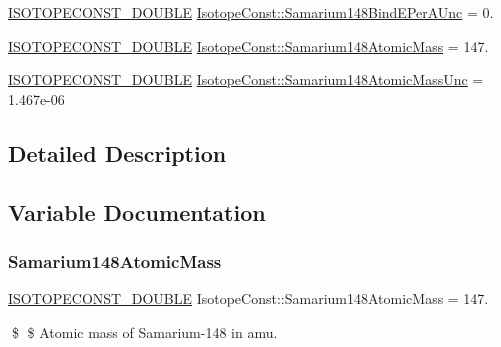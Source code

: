 \begin{DoxyCompactItemize}
\mbox{\hyperlink{group___isotope_const-_macros_ga8f45a7272ce02c0b4c65c44636ed719a}{I\+S\+O\+T\+O\+P\+E\+C\+O\+N\+S\+T\+\_\+\+D\+O\+U\+B\+LE}} \mbox{\hyperlink{group___isotope_const-_samarium-_sm148_gad64a4ff5a9c8838b513bfe84b3ed7021}{Isotope\+Const\+::\+Samarium148\+Bind\+E\+Per\+A\+Unc}} = 0.
\item 
\mbox{\hyperlink{group___isotope_const-_macros_ga8f45a7272ce02c0b4c65c44636ed719a}{I\+S\+O\+T\+O\+P\+E\+C\+O\+N\+S\+T\+\_\+\+D\+O\+U\+B\+LE}} \mbox{\hyperlink{group___isotope_const-_samarium-_sm148_ga2114168440218722fac34027bbcd74f6}{Isotope\+Const\+::\+Samarium148\+Atomic\+Mass}} = 147.
\item 
\mbox{\hyperlink{group___isotope_const-_macros_ga8f45a7272ce02c0b4c65c44636ed719a}{I\+S\+O\+T\+O\+P\+E\+C\+O\+N\+S\+T\+\_\+\+D\+O\+U\+B\+LE}} \mbox{\hyperlink{group___isotope_const-_samarium-_sm148_gad35de4c149ee1a39d3cb49550cb1d5a1}{Isotope\+Const\+::\+Samarium148\+Atomic\+Mass\+Unc}} = 1.\+467e-\/06
\end{DoxyCompactItemize}


\subsection{Detailed Description}


\subsection{Variable Documentation}
\mbox{\label{group___isotope_const-_samarium-_sm148_ga2114168440218722fac34027bbcd74f6}} 
\subsubsection{\texorpdfstring{Samarium148\+Atomic\+Mass}{Samarium148AtomicMass}}
{\footnotesize\ttfamily \mbox{\hyperlink{group___isotope_const-_macros_ga8f45a7272ce02c0b4c65c44636ed719a}{I\+S\+O\+T\+O\+P\+E\+C\+O\+N\+S\+T\+\_\+\+D\+O\+U\+B\+LE}} Isotope\+Const\+::\+Samarium148\+Atomic\+Mass = 147.}

\$ \$ Atomic mass of Samarium-\/148 in amu. \mbox{\label{group___isotope_const-_samarium-_sm148_gad35de4c149ee1a39d3cb49550cb1d5a1}} 
